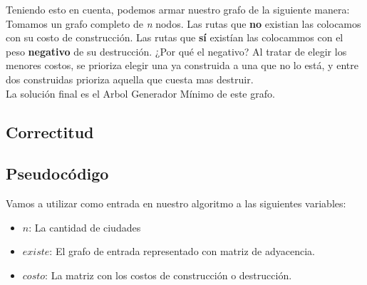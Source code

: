 Teniendo esto en cuenta, podemos armar nuestro grafo de la siguiente manera: \\

Tomamos un grafo completo de \textit{n} nodos. Las rutas que \textbf{no} existian las colocamos con su costo de construcción. Las rutas que \textbf{sí} existían las colocammos con el peso \textbf{negativo} de su destrucción. ¿Por qué el negativo? Al tratar de elegir los menores costos, se prioriza elegir una ya construida a una que no lo está, y entre dos construidas prioriza aquella que cuesta mas destruir. \\

La solución final es el Arbol Generador Mínimo de este grafo. \\



\subsection{Correctitud}



\subsection{Pseudocódigo}

Vamos a utilizar como entrada en nuestro algoritmo a las siguientes variables:
\begin{itemize}
	\item $n$: La cantidad de ciudades
	\item $existe$: El grafo de entrada representado con matriz de adyacencia.
	\item $costo$: La matriz con los costos de construcci\'on o destrucci\'on.
\end{itemize}

